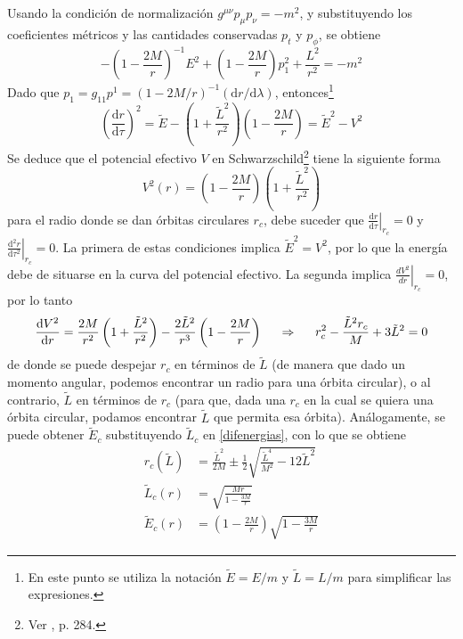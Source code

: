 \documentclass[11pt,twoside,openright,spanish]{report}
\numberwithin{equation}{chapter}
\numberwithin{figure}{chapter}
\numberwithin{table}{chapter}
\begin{document}
Usando la condición de normalización $g^{\mu\nu}p_\mu p_\nu=-m^2$, y substituyendo los coeficientes métricos y las cantidades conservadas $p_t$ y $p_\phi$, se obtiene
\begin{equation}
-\left(1-\frac{2M}{r}\right)^{-1}E^2+\left(1-\frac{2M}{r}\right)p_1^2+\frac{L^2}{r^2}=-m^2
\end{equation}
Dado que $p_1=g_{11}p^1=\left(1-2M/r\right)^{-1}\left(\text{d}r/\text{d}\lambda\right)$, entonces\footnote{En este punto se utiliza la notación $\tilde{E}=E/m$ y $\tilde{L}=L/m$ para simplificar las expresiones.}
\begin{equation}
\left(\frac{\text{d}r}{\text{d}\tau}\right)^2=\tilde{E}-\left(1+\frac{\tilde{L}^2}{r^2}\right)\left(1-\frac{2M}{r}\right)=\tilde{E}^2-V^2
\label{difenergias}
\end{equation}
Se deduce que el potencial efectivo $V$ en Schwarzschild\footnote{Ver \citet{schutz}, p. 284.} tiene la siguiente forma 
\begin{equation}
V^2(r)=\left(1-\frac{2M}{r}\right)\left(1+\frac{\tilde{L}^2}{r^2}\right)
\end{equation}
para el radio donde se dan órbitas circulares $r_c$, debe suceder que $\left.\frac{\text{d}r}{\text{d}\tau}\right|_{r_c}=0$ y $\left.\frac{\text{d}^2r}{\text{d}\tau^2}\right|_{r_c}=0$. La primera de estas condiciones implica $\tilde{E}^2=V^2$, por lo que la energía debe de situarse en la curva del potencial efectivo. La segunda implica $\left.\frac{dV^2}{dr}\right|_{r_c}=0$, por lo tanto
\begin{equation*}
\frac{\text{d}V^2}{\text{d}r}=\frac{2M}{r^2}\left(1+\frac{\tilde{L}^2}{r^2}\right)-\frac{2\tilde{L}^2}{r^3}\left(1-\frac{2M}{r}\right)\hspace{0.5cm} \Rightarrow\hspace{0.5cm} r_c^2-\frac{\tilde{L}^2r_c}{M}+3\tilde{L}^2=0
\end{equation*}
de donde se puede despejar $r_c$ en términos de $\tilde{L}$ (de manera que dado un momento angular, podemos encontrar un radio para una órbita circular), o al contrario, $\tilde{L}$ en términos de $r_c$ (para que, dada una $r_c$ en la cual se quiera una órbita circular, podamos encontrar $\tilde{L}$ que permita esa órbita). Análogamente, se puede obtener $\tilde{E}_c$ substituyendo $\tilde{L}_c$ en \eqref{difenergias}, con lo que se obtiene
\begin{align}
r_c(\tilde{L})&=\frac{\tilde{L}^2}{2M}\pm\frac{1}{2}\sqrt{\frac{\tilde{L}^4}{M^2}-12\tilde{L}^2}
\label{rc}\\
\tilde{L}_c(r)&=\sqrt{\frac{Mr}{1-\frac{3M}{r}}}
\label{Lc}\\
\tilde{E}_c(r)&=\left(1-\frac{2M}{r}\right)\sqrt{1-\frac{3M}{r}}
\label{Ec}
\end{align}
\end{document}
